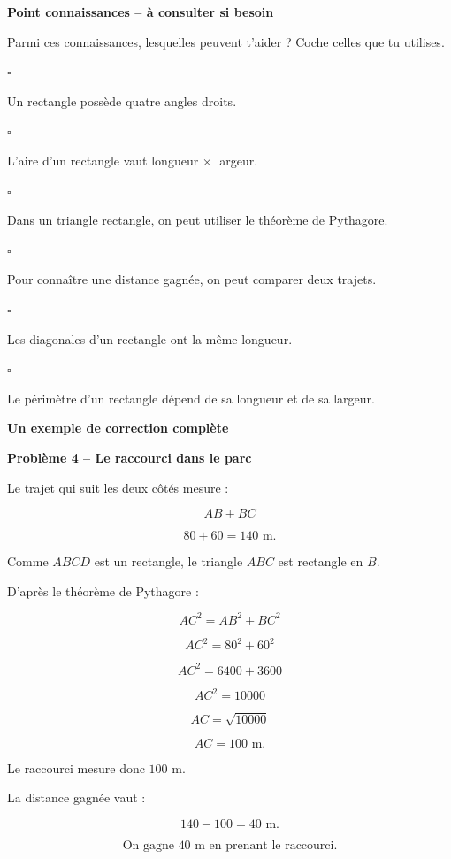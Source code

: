 \documentclass[11pt,a4paper]{article}
\newcommand{\titrecorrection}[1]{%
\noindent
\begin{minipage}{\linewidth}
\centering
{\sffamily\LARGE\bfseries\color{TitreC}
Un exemple de correction complète}

\vspace{0.5mm}

{\sffamily\large\bfseries\color{SavoirC}
#1}
\end{minipage}

\vspace{2mm}
}
\newcommand{\casecocher}[1]{%
\noindent
\(\square\)\hspace{0.35em}%
\parbox[t]{0.89\linewidth}{#1}
\par
\vspace{0.15em}
}
\newcommand{\pagecorrection}[2]{%

\titrecorrection{#1}

\begin{correctionbox}

#2

\end{correctionbox}
}
\begin{document}
\begin{connaissancesbox}

{\sffamily\bfseries\color{SavoirC}
Point connaissances -- à consulter si besoin}

\smallskip

Parmi ces connaissances, lesquelles peuvent t'aider ?
Coche celles que tu utilises.

\smallskip

\begin{minipage}[t]{0.49\linewidth}

\casecocher{Un rectangle possède quatre angles droits.}

\casecocher{L'aire d'un rectangle vaut
longueur \(\times\) largeur.}

\casecocher{Dans un triangle rectangle,
on peut utiliser le théorème de Pythagore.}

\end{minipage}
\hfill
\begin{minipage}[t]{0.49\linewidth}

\casecocher{Pour connaître une distance gagnée,
on peut comparer deux trajets.}

\casecocher{Les diagonales d'un rectangle ont la même longueur.}

\casecocher{Le périmètre d'un rectangle dépend
de sa longueur et de sa largeur.}

\end{minipage}

\end{connaissancesbox}

\newpage


\pagecorrection{Problème 4 -- Le raccourci dans le parc}{

Le trajet qui suit les deux côtés mesure :

\[
AB+BC
\]

\[
80+60=140\text{ m}.
\]

Comme \(ABCD\) est un rectangle,
le triangle \(ABC\) est rectangle en \(B\).

D'après le théorème de Pythagore :

\[
AC^2=AB^2+BC^2
\]

\[
AC^2=80^2+60^2
\]

\[
AC^2=6400+3600
\]

\[
AC^2=10000
\]

\[
AC=\sqrt{10000}
\]

\[
AC=100\text{ m}.
\]

Le raccourci mesure donc \(100\) m.

La distance gagnée vaut :

\[
140-100=40\text{ m}.
\]

\[
\boxed{\text{On gagne }40\text{ m en prenant le raccourci}.}
\]
}
\end{document}
